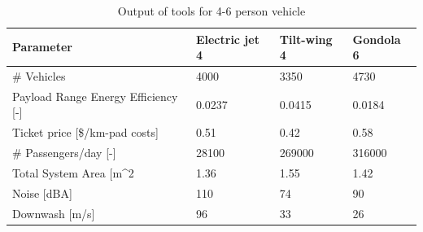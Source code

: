 \begin{table}[h]
\centering
\captionsetup{justification=centering}
\caption{Output of tools for 4-6 person vehicle}
\label{46output}
\begin{tabular}{@{}llll@{}}
\toprule
\textbf{Parameter}                                          & \textbf{Electric jet 4} & \textbf{Tilt-wing 4} & \textbf{Gondola 6} \\ \midrule
\# Vehicles                                                 &      4000      &     3350       &   4730         \\
Payload Range Energy Efficiency    {[}-{]}                      &     0.0237       &    0.0415        &   0.0184         \\
Ticket price {[}\$/km-pad costs{]}                          &   0.51          & 0.42                 & 0.58         \\
\# Passengers/day {[}-{]}                                   &     28100       &    269000        &     316000       \\
Total System Area {[}m\textasciicircum{}2                   &     1.36       &     1.55       &      1.42      \\
Noise {[}dBA{]}                                             &      110      &    74        &     90       \\ 
Downwash {[}m/s{]}                                          &       96      &    33     &  26  \\ \bottomrule
\end{tabular}
\end{table}



